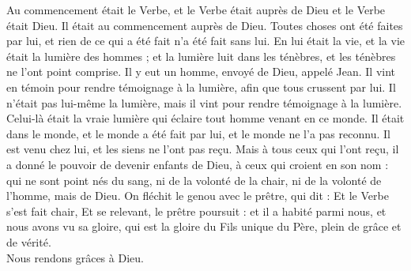 \documentclass[Carnet_RG_2025.tex]{subfiles}
\begin{document}
{Au commencement était le Verbe, et le Verbe était auprès de Dieu et le Verbe était Dieu. Il était au commencement auprès de Dieu. Toutes choses ont été faites par lui, et rien de ce qui a été fait n’a été fait sans lui. En lui était la vie, et la vie était la lumière des hommes ; et la lumière luit dans les ténèbres, et les ténèbres ne l’ont point comprise.
Il y eut un homme, envoyé de Dieu, appelé Jean. Il vint en témoin pour rendre témoignage à la lumière, afin que tous crussent par lui. Il n’était pas lui-même la lumière, mais il vint pour rendre témoignage à la lumière.
Celui-là était la vraie lumière qui éclaire tout homme venant en ce monde. Il était dans le monde, et le monde a été fait par lui, et le monde ne l’a pas reconnu. Il est venu chez lui, et les siens ne l’ont pas reçu.
Mais à tous ceux qui l’ont reçu, il a donné le pouvoir de devenir enfants de Dieu, à ceux qui croient en son nom : qui ne sont point nés du sang, ni de la volonté de la chair, ni de la volonté de l’homme, mais de Dieu. On fléchit le genou avec le prêtre, qui dit : Et le Verbe s’est fait chair, Et se relevant, le prêtre poursuit : et il a habité parmi nous, et nous avons vu sa gloire, qui est la gloire du Fils unique du Père, plein de grâce et de vérité.\\
\rr Nous rendons grâces à Dieu.

}
\end{document}
